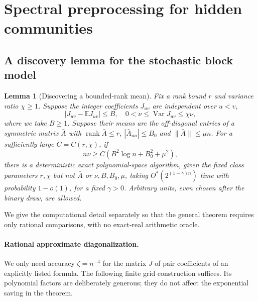 \documentclass[11pt,a4paper]{article}
\newtheorem{lemma}[theorem]{Lemma}
\theoremstyle{definition}
\theoremstyle{remark}
\newcommand{\Ostar}{O^{*}}
\newcommand{\E}{\mathbb E}
\DeclareMathOperator{\rank}{rank}
\begin{document}
\section{Spectral preprocessing for hidden communities}\label{app:discovery}

\subsection{A discovery lemma for the stochastic block model}

\begin{lemma}[Discovering a bounded-rank mean]\label{cor:planted}
Fix a rank bound $r$ and variance ratio $\chi\ge1$. Suppose the integer
coefficients $J_{uv}$ are independent over $u<v$,
\[
 |J_{uv}-\E J_{uv}|\le B,\quad
 0<\nu\le\operatorname{Var}J_{uv}\le\chi\nu,
\]
where we take $B\ge1$. Suppose their means are the off-diagonal entries
of a symmetric matrix $\bar A$ with
$\rank\bar A\le r$, $|\bar A_{uu}|\le B_0$ and $\|\bar A\|\le\mu n$.
For a sufficiently large $C=C(r,\chi)$, if
\[
 n\nu\ge C(B^2\log n+B_0^2+\mu^2),
\]
there is a deterministic exact polynomial-space algorithm, given the fixed
class parameters $r,\chi$ but not $\bar A$ or $\nu,B,B_0,\mu$, taking
$\Ostar(2^{(1-\gamma)n})$ time with probability $1-o(1)$, for a fixed
$\gamma>0$. Arbitrary units, even chosen after the binary draw, are allowed.
\end{lemma}


We give the computational detail separately so that the general theorem
requires only rational comparisons, with no exact-real arithmetic oracle.

\paragraph{Rational approximate diagonalization.}
We only need accuracy $\zeta=n^{-4}$ for the matrix $J$ of pair
coefficients of an explicitly listed formula. The following finite grid construction suffices.
Its polynomial factors are deliberately generous; they do not affect the
exponential saving in the theorem.
\end{document}
